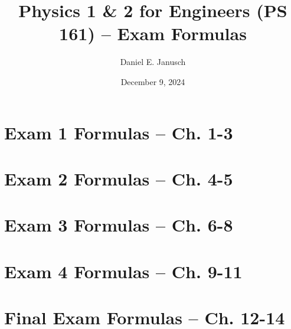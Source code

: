 \documentclass[12pt]{article}
\begin{document}
\title{Physics 1 \& 2 for Engineers (PS 161) – Exam Formulas}
\author{Daniel E. Janusch}
\date{December 9, 2024}
\maketitle

\tableofcontents

\newpage \section{Exam 1 Formulas – Ch. 1-3} 
\newpage \section{Exam 2 Formulas – Ch. 4-5} 
\newpage \section{Exam 3 Formulas – Ch. 6-8} 
\newpage \section{Exam 4 Formulas – Ch. 9-11} 
\newpage \section{Final Exam Formulas – Ch. 12-14} 
\end{document}
